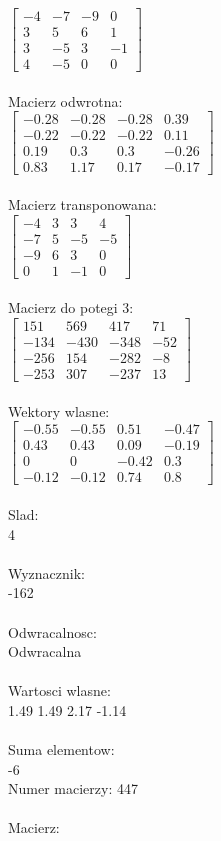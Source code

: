 \documentclass[a4paper,12pt]{article}
\begin{document}
$\begin{bmatrix} -4&-7&-9&0\\3&5&6&1\\3&-5&3&-1\\4&-5&0&0 \end{bmatrix}$
\\
\\
Macierz odwrotna:\\

$\begin{bmatrix} -0.28&-0.28&-0.28&0.39\\-0.22&-0.22&-0.22&0.11\\0.19&0.3&0.3&-0.26\\0.83&1.17&0.17&-0.17 \end{bmatrix}$
\\
\\
Macierz transponowana:\\

$\begin{bmatrix} -4&3&3&4\\-7&5&-5&-5\\-9&6&3&0\\0&1&-1&0 \end{bmatrix}$
\\
\\
Macierz do potegi 3:\\

$\begin{bmatrix} 151&569&417&71\\-134&-430&-348&-52\\-256&154&-282&-8\\-253&307&-237&13 \end{bmatrix}$
\\
\\
Wektory wlasne:\\

$\begin{bmatrix} -0.55&-0.55&0.51&-0.47\\0.43&0.43&0.09&-0.19\\0&0&-0.42&0.3\\-0.12&-0.12&0.74&0.8 \end{bmatrix}$
\\
\\
Slad:\\
4
\\
\\
Wyznacznik:\\
-162
\\
\\
Odwracalnosc:\\
Odwracalna
\\
\\
Wartosci wlasne:\\
1.49 1.49 2.17 -1.14
\\
\\
Suma elementow:\\
-6
\\
\newpage
Numer macierzy:
447
\\
\\
Macierz:\\
\end{document}
